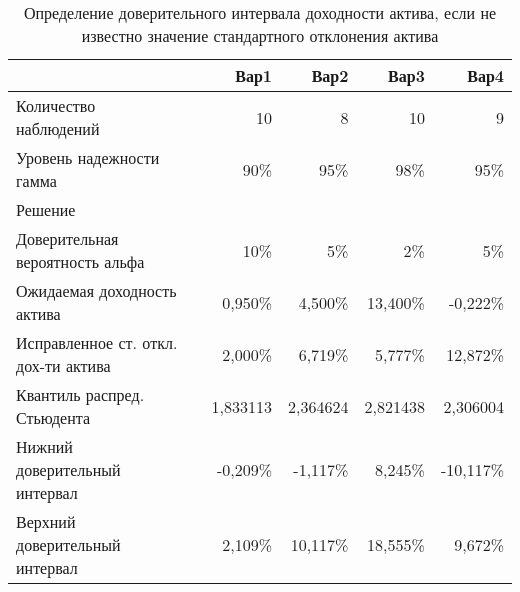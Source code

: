\documentclass[12pt,a4paper]{article}
\begin{document}
\begin{taskrus}
\begin{table}[H]
  \centering
  \caption{Определение доверительного интервала доходности актива, если не известно значение стандартного отклонения актива
}
    \begin{tabular}{lrrrrr}
    \toprule
          &       & Вар1  & Вар2  & Вар3  & Вар4 \\
    \midrule
    Количество наблюдений &       & 10    & 8     & 10    & 9 \\
    Уровень надежности гамма &       & 90\%  & 95\%  & 98\%  & 95\% \\
    \midrule
    Решение &       &       &       &       &  \\
    \midrule
    Доверительная вероятность альфа &       & 10\%  & 5\%   & 2\%   & 5\% \\
    Ожидаемая доходность актива &       & 0,950\% & 4,500\% & 13,400\% & -0,222\% \\
    \specialcell{Исправленное ст. откл.\\дох-ти актива} &       & 2,000\% & 6,719\% & 5,777\% & 12,872\% \\
    Квантиль распред. Стьюдента &       & 1,833113 & 2,364624 & 2,821438 & 2,306004 \\
    Нижний доверительный интервал &       & -0,209\% & -1,117\% & 8,245\% & -10,117\% \\
    Верхний доверительный интервал &       & 2,109\% & 10,117\% & 18,555\% & 9,672\% \\
    \bottomrule
    \end{tabular}%
  \label{tab:addlabel}%
\end{table}%
\end{taskrus}
\end{document}
